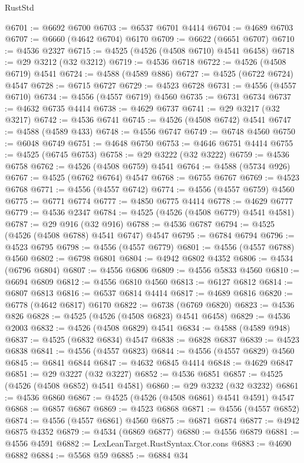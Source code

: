 \begin{lexlean}{RustStd}
\begin{coremodule}
@6701 := @6692 @6700
@6703 := @6537 @6701 @4414
@6704 := @4689 @6703
@6707 := @6660 (@4642 @6704) @6170
@6709 := @6622 (@6651 @6707)
@6710 := @4536 @2327
@6715 := @4525 (@4526 (@4508 @6710) @4541 @6458)
@6718 := @29 @3212 (@32 @3212)
@6719 := @4536 @6718
@6722 := @4526 (@4508 @6719) @4541
@6724 := @4588 (@4589 @886)
@6727 := @4525 (@6722 @6724) @4547
@6728 := @6715 @6727
@6729 := @4523 @6728
@6731 := @4556 (@4557 @6710)
@6734 := @4556 (@4557 @6719) @4560
@6735 := @6731 @6734
@6737 := @4632 @6735 @4414
@6738 := @4629 @6737
@6741 := @29 @3217 (@32 @3217)
@6742 := @4536 @6741
@6745 := @4526 (@4508 @6742) @4541
@6747 := @4588 (@4589 @433)
@6748 := @4556 @6747
@6749 := @6748 @4560
@6750 := @6048 @6749
@6751 := @4648 @6750
@6753 := @4646 @6751 @4414
@6755 := @4525 (@6745 @6753)
@6758 := @29 @3222 (@32 @3222)
@6759 := @4536 @6758
@6762 := @4526 (@4508 @6759) @4541
@6764 := @4588 (@5734 @926)
@6767 := @4525 (@6762 @6764) @4547
@6768 := @6755 @6767
@6769 := @4523 @6768
@6771 := @4556 (@4557 @6742)
@6774 := @4556 (@4557 @6759) @4560
@6775 := @6771 @6774
@6777 := @4850 @6775 @4414
@6778 := @4629 @6777
@6779 := @4536 @2347
@6784 := @4525 (@4526 (@4508 @6779) @4541 @4581)
@6787 := @29 @916 (@32 @916)
@6788 := @4536 @6787
@6794 := @4525 (@4526 (@4508 @6788) @4541 @6747) @4547
@6795 := @6784 @6794
@6796 := @4523 @6795
@6798 := @4556 (@4557 @6779)
@6801 := @4556 (@4557 @6788) @4560
@6802 := @6798 @6801
@6804 := @4942 @6802 @4352
@6806 := @4534 (@6796 @6804)
@6807 := @4556 @6806
@6809 := @4556 @5833 @4560
@6810 := @6694 @6809
@6812 := @4556 @6810 @4560
@6813 := @6127 @6812
@6814 := @6807 @6813
@6816 := @6537 @6814 @4414
@6817 := @4689 @6816
@6820 := @6778 (@4642 @6817) @6170
@6822 := @6738 (@6769 @6820)
@6823 := @4536 @826
@6828 := @4525 (@4526 (@4508 @6823) @4541 @6458)
@6829 := @4536 @2003
@6832 := @4526 (@4508 @6829) @4541
@6834 := @4588 (@4589 @948)
@6837 := @4525 (@6832 @6834) @4547
@6838 := @6828 @6837
@6839 := @4523 @6838
@6841 := @4556 (@4557 @6823)
@6844 := @4556 (@4557 @6829) @4560
@6845 := @6841 @6844
@6847 := @4632 @6845 @4414
@6848 := @4629 @6847
@6851 := @29 @3227 (@32 @3227)
@6852 := @4536 @6851
@6857 := @4525 (@4526 (@4508 @6852) @4541 @4581)
@6860 := @29 @3232 (@32 @3232)
@6861 := @4536 @6860
@6867 := @4525 (@4526 (@4508 @6861) @4541 @4591) @4547
@6868 := @6857 @6867
@6869 := @4523 @6868
@6871 := @4556 (@4557 @6852)
@6874 := @4556 (@4557 @6861) @4560
@6875 := @6871 @6874
@6877 := @4942 @6875 @4352
@6879 := @4534 (@6869 @6877)
@6880 := @4556 @6879
@6881 := @4556 @4591
@6882 := LexLeanTarget.RustSyntax.Ctor.cons
@6883 := @4690 @6882
@6884 := @5568 @59
@6885 := @6884 @34

\end{coremodule}
\end{lexlean}
